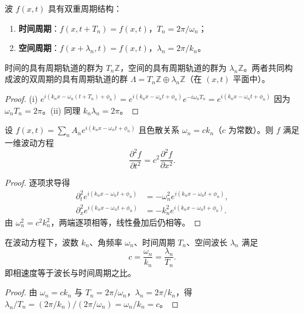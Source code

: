 \begin{proposition}[波的双重周期结构]\label{prop:wave_double_period}
波 $f(x,t)$ 具有双重周期结构：
\begin{enumerate}[label=(\roman*)]
    \item \textbf{时间周期}：$f(x, t + T_n) = f(x, t)$，$T_n = 2\pi/\omega_n$；
    \item \textbf{空间周期}：$f(x + \lambda_n, t) = f(x, t)$，$\lambda_n = 2\pi/k_n$。
\end{enumerate}
时间的具有周期轨道的群为 $T_n\mathbb{Z}$，空间的具有周期轨道的群为 $\lambda_n\mathbb{Z}$。两者共同构成波的双周期的具有周期轨道的群 $\Lambda = T_n\mathbb{Z} \oplus \lambda_n\mathbb{Z}$（在 $(x,t)$ 平面中）。
\end{proposition}

\begin{proof}
(i) $e^{i(k_n x - \omega_n(t+T_n) + \phi_n)} = e^{i(k_n x - \omega_n t + \phi_n)} e^{-i\omega_n T_n} = e^{i(k_n x - \omega_n t + \phi_n)}$ 因为 $\omega_n T_n = 2\pi$。(ii) 同理 $k_n \lambda_n = 2\pi$。
\end{proof}

\begin{proposition}[波满足波动方程]\label{prop:wave_satisfies_wave_equation}
设 $f(x,t) = \sum_n A_n e^{i(k_n x - \omega_n t + \phi_n)}$ 且色散关系 $\omega_n = c k_n$（$c$ 为常数）。则 $f$ 满足一维波动方程
\[
\frac{\partial^2 f}{\partial t^2} = c^2 \frac{\partial^2 f}{\partial x^2}.
\]
\end{proposition}

\begin{proof}
逐项求导得
\[
\begin{aligned}
\partial_t^2 e^{i(k_n x-\omega_n t+\phi_n)} &= -\omega_n^2 e^{i(k_n x-\omega_n t+\phi_n)},\\
\partial_x^2 e^{i(k_n x-\omega_n t+\phi_n)} &= -k_n^2 e^{i(k_n x-\omega_n t+\phi_n)}.
\end{aligned}
\]
由 $\omega_n^2 = c^2 k_n^2$，两端逐项相等，线性叠加后仍相等。
\end{proof}

\begin{corollary}[色散关系与双重周期的耦合]\label{cor:dispersion_double_period}
在波动方程下，波数 $k_n$、角频率 $\omega_n$、时间周期 $T_n$、空间波长 $\lambda_n$ 满足
\[
c = \frac{\omega_n}{k_n} = \frac{\lambda_n}{T_n}.
\]
即相速度等于波长与时间周期之比。
\end{corollary}

\begin{proof}
由 $\omega_n = c k_n$ 与 $T_n=2\pi/\omega_n$，$\lambda_n=2\pi/k_n$，得 $\lambda_n/T_n = (2\pi/k_n)/(2\pi/\omega_n)=\omega_n/k_n=c$。
\end{proof}

